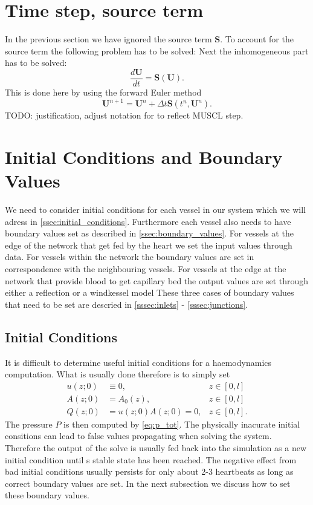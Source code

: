\documentclass[a4paper, oneside]{discothesis}
\begin{document}
\section{Time step, source term} \label{sec:fe}
In the previous section we have ignored the source term $\mathbf{S}$.
To account for the source term the following problem has to be solved:
Next the inhomogeneous part has to be solved:
\begin{equation}
			\frac{d \mathbf{U}}{d t}=\mathbf{S}(\mathbf{U}) .
\end{equation}
This is done here by using the forward Euler method
\begin{equation}
	\mathbf{U}^{n+1}=\mathbf{U}^n + \Delta t \mathbf{S}\left(t^n, \mathbf{U}^n\right).
\end{equation}
TODO: justification, adjust notation for to reflect MUSCL step.


\section{Initial Conditions and Boundary Values} \label{sec:icbc}
We need to consider initial conditions for each vessel in our system which we will adress in \autoref{ssec:initial_conditions}.
Furthermore each vessel also needs to have boundary values set as described in \autoref{ssec:boundary_values}.
For vessels at the edge of the network that get fed by the heart we set the input values through data.
For vessels within the network the boundary values are set in correspondence with the neighbouring vessels.
For vessels at the edge at the network that provide blood to get capillary bed the output values are set through either a reflection or a windkessel model
These three cases of boundary values that need to be set are descried in \autoref{sssec:inlets} - \autoref{sssec:junctions}.
\subsection{Initial Conditions} \label{ssec:initial_conditions}
It is difficult to determine useful initial conditions for a haemodynamics computation.
What is usually done therefore is to simply set
\begin{align}
	u(z;0) &\equiv 0, &z \in [0,l]\\
	A(z;0) &= A_0(z), &z \in [0,l] \\
	Q(z;0) &= u(z;0)A(z;0) = 0, &z \in [0,l].
\end{align}
The pressure $P$ is then computed by \autoref{eq:p_tot}.
The physically inacurate initial consitions can lead to false values propagating when solving the system.
Therefore the output of the solve is usually fed back into the simulation as a new initial condition until s stable state has been reached.
The negative effect from bad initial conditions usually persists for only about 2-3 heartbeats as long as correct boundary values are set.\cite{formaggia2010cardiovascular}
In the next subsection we discuss how to set these boundary values. 
\end{document}
